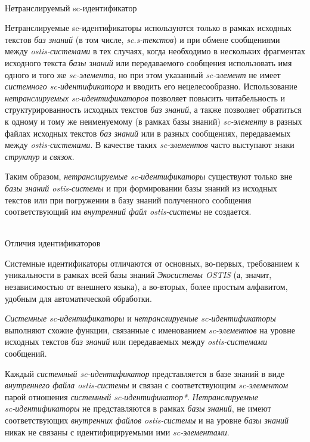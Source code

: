 \begin{frame}{\\Нетранслируемый sc-идентификатор}
	\topline
	\justifying
	\vspace*{\fill}\\
	\footnotesize{
	Нетранслируемые sc-идентификаторы используются только в рамках исходных текстов \textit{баз знаний} (в том числе, \textit{sc.s-текстов}) и при обмене сообщениями между \textit{ostis-системами} в тех случаях, когда необходимо в нескольких фрагментах исходного текста \textit{базы знаний} или передаваемого сообщения использовать имя одного и того же \textit{sc-элемента}, но при этом указанный \textit{sc-элемент} не имеет \textit{системного sc-идентификатора} и вводить его нецелесообразно. Использование \textit{нетранслируемых sc-идентификаторов} позволяет повысить читабельность и структурированность исходных текстов \textit{баз знаний}, а также позволяет обратиться к одному и тому же неименуемому (в рамках базы знаний) \textit{sc-элементу} в разных файлах исходных текстов \textit{баз знаний} или в разных сообщениях, передаваемых между \textit{ostis-системами}. В качестве таких \textit{sc-элементов} часто выступают знаки \textit{структур} и \textit{связок}.

	Таким образом, \textit{нетранслируемые sc-идентификаторы} существуют только вне \textit{базы знаний ostis-системы} и при формировании базы знаний из исходных текстов или при погружении в базу знаний полученного сообщения соответствующий им \textit{внутренний файл ostis-системы} не создается.}
\end{frame}

\begin{frame}{\\Отличия идентификаторов}
	\topline
	\justifying
	\vspace*{\fill}\\
	\small{
		Системные идентификаторы отличаются от основных, во-первых, требованием к уникальности в рамках всей базы знаний \textit{Экосистемы OSTIS} (а, значит, независимостью от внешнего языка), а во-вторых, более простым алфавитом, удобным для автоматической обработки.
		
		\textit{Системные sc-идентификаторы} и \textit{нетранслируемые sc-идентификаторы} выполняют схожие функции, связанные с именованием \textit{sc-элементов} на уровне исходных текстов \textit{баз знаний} или передаваемых между \textit{ostis-системами} сообщений.
		
		Каждый \textit{системный sc-идентификатор} представляется в базе знаний в виде \textit{внутреннего файла ostis-системы} и связан с соответствующим \textit{sc-элементом} парой отношения \textit{системный \mbox{sc-идентификатор*}}. \textit{Нетранслируемые\\ sc-идентификаторы} не представляются в рамках \textit{базы знаний}, не имеют соответствующих \textit{внутренних файлов ostis-системы} и на уровне \textit{базы знаний} никак не связаны с идентифицируемыми ими \textit{sc-элементами}.
	}
\end{frame}

